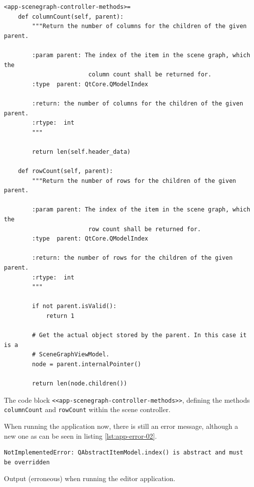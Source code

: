 \documentclass[10pt, openright, notitlepage]{scrreprt}
\begin{document}
\begin{listing}[H]
\begin{verbatim}
<app-scenegraph-controller-methods>=
    def columnCount(self, parent):
        """Return the number of columns for the children of the given parent.
    
        :param parent: The index of the item in the scene graph, which the
                        column count shall be returned for.
        :type  parent: QtCore.QModelIndex
    
        :return: the number of columns for the children of the given parent.
        :rtype:  int
        """
    
        return len(self.header_data)

    def rowCount(self, parent):
        """Return the number of rows for the children of the given parent.
    
        :param parent: The index of the item in the scene graph, which the
                        row count shall be returned for.
        :type  parent: QtCore.QModelIndex
    
        :return: the number of rows for the children of the given parent.
        :rtype:  int
        """
    
        if not parent.isValid():
            return 1
    
        # Get the actual object stored by the parent. In this case it is a
        # SceneGraphViewModel.
        node = parent.internalPointer()
    
        return len(node.children())
\end{verbatim}
\caption{\label{lst:app-scenegraph-controller-methods-01}
The code block \texttt{<<app-scenegraph-controller-methods>>}, defining the methods \texttt{columnCount} and \texttt{rowCount} within the scene controller.}
\end{listing}

When running the application now, there is still an error message, although a
new one as can be seen in listing \ref{lst:app-error-02}.

\begin{listing}[H]
\begin{verbatim}
NotImplementedError: QAbstractItemModel.index() is abstract and must be overridden
\end{verbatim}
\caption{\label{lst:app-error-02}
Output (erroneous) when running the editor application.}
\end{listing}
\end{document}
